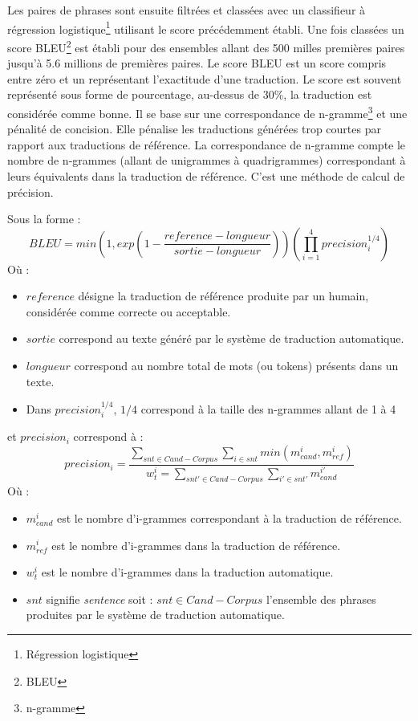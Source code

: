 Les paires de phrases sont ensuite filtrées et classées avec un classifieur à régression logistique\footnote{\gls{Régression logistique}}
utilisant le score précédemment établi.
Une fois classées un score BLEU\footnote{\gls{BLEU}} est établi pour des ensembles allant des 500 milles premières paires jusqu'à
5.6 millions de premières paires. Le score BLEU est un score compris entre zéro et un représentant
l'exactitude d'une traduction. Le score est souvent représenté sous forme de pourcentage, au-dessus de 30\%,
la traduction est considérée comme bonne. Il se base sur une correspondance de n-gramme\footnote{\gls{n-gramme}} et une pénalité de concision.
Elle pénalise les traductions générées trop courtes par rapport
aux traductions de référence. La correspondance de n-gramme compte le nombre de n-grammes (allant de unigrammes à quadrigrammes)
correspondant à leurs équivalents dans la traduction de référence. C'est une méthode de calcul de précision.

Sous la forme{ :}
\[ BLEU=min(1,exp(1-\frac{reference-longueur}{sortie-longueur}))(\prod_{i=1}^{4}precision_{i}^{1/4}) \]
Où{ :}
\begin{itemize}
    \item $reference$ désigne la traduction de référence produite par un humain, considérée comme correcte ou acceptable.
    \item $sortie$ correspond au texte généré par le système de traduction automatique.
    \item $longueur$ correspond au nombre total de mots (ou tokens) présents dans un texte.
    \item Dans $precision_{i}^{1/4}$, $1/4$ correspond à la taille des n-grammes allant de 1 à 4
\end{itemize}
et $precision_{i}$ correspond à{ :}
\[ precision_{i}=\frac{\sum_{snt \in Cand-Corpus}\sum_{i \in snt}min(m^{i}_{cand},m^{i}_{ref})}{w^{i}_{t}=\sum_{snt' \in Cand-Corpus}\sum_{i' \in snt'}m^{i'}_{cand}} \]
Où{ :}
\begin{itemize}
    \item $m^{i}_{cand}$ est le nombre d'i-grammes correspondant à la traduction de référence.
    \item $m^{i}_{ref}$ est le nombre d'i-grammes dans la traduction de référence.
    \item $w^{i}_{t}$ est le nombre d'i-grammes dans la traduction automatique.
    \item $snt$ signifie \textit{sentence} soit : $snt \in Cand-Corpus$ l'ensemble des phrases 
    produites par le système de traduction automatique.
\end{itemize}

